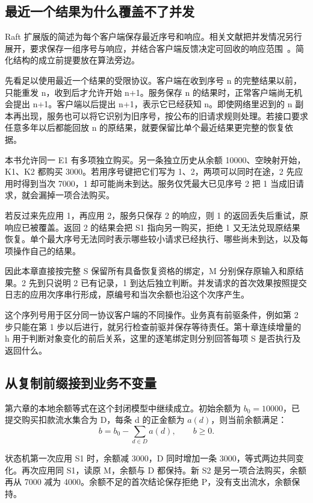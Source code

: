 \subsection*{最近一个结果为什么覆盖不了并发}

Raft 扩展版的简述为每个客户端保存最近序号和响应。相关文献把并发情况另行展开，要求保存一组序号与响应，并结合客户端反馈决定可回收的响应范围~\cite{raft,ongaro}。简化结构的成立前提要放在算法旁边。

先看足以使用最近一个结果的受限协议。客户端在收到序号 n 的完整结果以前，只能重发 n，收到后才允许开始 n+1。服务保存 n 的结果时，正常客户端尚无机会提出 n+1。客户端以后提出 n+1，表示它已经获知 n。即使网络里迟到的 n 副本再出现，服务也可以将它识别为旧序号，按公布的旧请求规则处理。若接口要求任意多年以后都能回放 n 的原结果，就要保留比单个最近结果更完整的恢复依据。

本书允许同一 E1 有多项独立购买。另一条独立历史从余额 10000、空映射开始，K1、K2 都购买 3000。若用序号键把它们写为 1、2，两项可以同时在途，2 先应用时得到当次 7000，1 却可能尚未到达。服务仅凭最大已见序号 2 把 1 当成旧请求，就会漏掉一项合法购买。

若反过来先应用 1，再应用 2，服务只保存 2 的响应，则 1 的返回丢失后重试，原响应已被覆盖。返回 2 的结果会把 S1 指向另一购买，拒绝 1 又无法兑现原结果恢复。单个最大序号无法同时表示哪些较小请求已经执行、哪些尚未到达，以及每项操作自己的结果。


因此本章直接按完整 S 保留所有具备恢复资格的绑定，M 分别保存原输入和原结果。2 先到只说明 2 已有记录，1 到达后独立判断。并发请求的首次效果按照提交日志的应用次序串行形成，原编号和当次余额也沿这个次序产生。

这个序列号用于区分同一协议客户端的不同操作。业务真有前驱条件，例如第 2 步只能在第 1 步以后进行，就另行检查前驱并保存等待责任。第十章连续增量的 h 用于判断对象变化的前后关系，这里的逐笔绑定则分别回答每项 S 是否执行及返回什么。

\subsection*{从复制前缀接到业务不变量}

第六章的本地余额等式在这个封闭模型中继续成立。初始余额为 $b_0=10000$，已提交购买扣款流水集合为 D，每条 d 的正金额为 $a(d)$，则当前余额满足：
\[
  b=b_0-\sum_{d\in D}a(d),\qquad b\ge 0.
\]

状态机第一次应用 S1 时，余额减 3000，D 同时增加一条 3000，等式两边共同变化。再次应用同 S1，读原 M，余额与 D 都保持。新 S2 是另一项合法购买，余额再从 7000 减为 4000。余额不足的首次结论保存拒绝 P，没有支出流水，余额保持。

